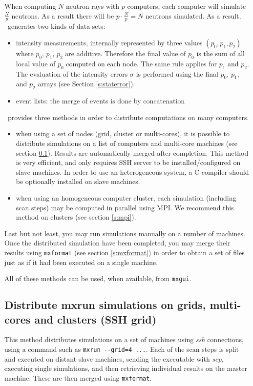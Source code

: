When computing $N$ neutron rays with
$p$ computers, each computer will simulate $\frac{N}{p}$
neutrons. As a result there will be $p \cdot \frac{N}{p} = N$
neutrons simulated. As a result, \MCX\ generates two kinds of data sets:
\begin{itemize}
\item intensity measurements, internally represented by three
  values $(p_0, p_1, p_2)$ where $p_0$, $p_1$, $p_2$ are
  additive. Therefore the final value of $p_0$ is the sum of all
  local value of  $p_0$ computed on each node. The same rule applies
  for $p_1$ and $p_2$. The evaluation of the intensity errors $\sigma$
  is performed using the final $p_0$, $p_1$, and $p_2$ arrays (see Section \ref{s:staterror}).
\item event lists: the merge of events is done by concatenation
\end{itemize}

\MCX\ provides three methods in order to distribute computations on many computers.
\begin{itemize}
\item when using a set of nodes (grid, cluster or multi-cores), it is possible to distribute simulations on a 
  list of computers and multi-core machines (see section \ref{s:ssh-grid}). Results are automatically 
  merged after completion. 
  This method is very efficient, and only requires SSH server to be installed/configured on slave machines. 
  In order to use an heterogeneous system, a C compiler should be optionally installed on slave machines.
\item when using an homogeneous computer cluster, each simulation (including scan
  steps) may be computed in parallel using MPI. We recommend this method on clusters (see section \ref{s:mpi}).
\end{itemize}

Last but not least, you may run simulations manually on a number of machines.
Once the distributed simulation have been completed, you may merge their results using \verb+mxformat+ (see section \ref{s:mxformat})  in order to obtain a set of files just as if it had been executed on a single machine.

All of these methods can be used, when available, from \texttt{mxgui}.

\subsection{Distribute mxrun simulations on grids, multi-cores and clusters (SSH grid)}
\label{s:ssh-grid}
  This method distributes simulations on a set of machines using \emph{ssh}
  connections, using a command such as \verb+mxrun --grid=4 ...+. 
  Each of the scan steps is split and executed on distant slave machines, sending the executable
  with \emph{scp}, executing single simulations, and then retrieving individual
  results on the master machine. These are then merged using \texttt{mxformat}. 
  
